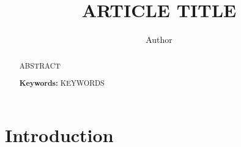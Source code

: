 \documentclass[a4paper,11pt]{amsart}
\begin{document}


\title[ARTICLE TITLE]{ARTICLE TITLE}

\author{Author}

\address{\noindent AFFILIATION}


\begin{abstract}
ABSTRACT 

  \vspace{0.7cm}

\noindent \textbf{Keywords:} KEYWORDS  
\end{abstract}

\maketitle

\setcounter{tocdepth}{1}
\tableofcontents






\section{Introduction}









\end{document}

